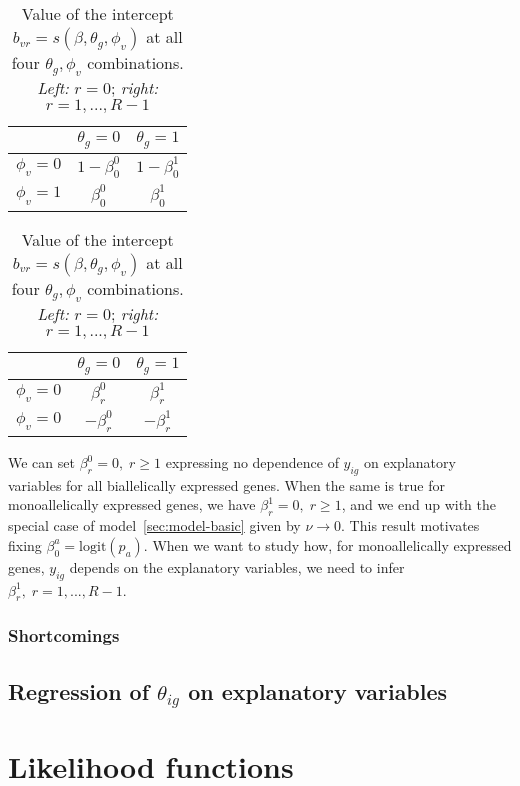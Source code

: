 \documentclass[letterpaper]{article}
\begin{document}
\begin{table}[h]
\begin{center}
\begin{tabular}{c|cc|}
& \(\theta_g=0\) & \(\theta_g=1\) \\
\hline
\(\phi_v=0\) & \(1-\beta_0^0\) & \(1-\beta_0^1\) \\
\(\phi_v=1\) & \(\beta_0^0\) & \(\beta_0^1\) \\
\hline
\end{tabular}
\hspace{\columnsep}
\begin{tabular}{c|cc|}
& \(\theta_g=0\) & \(\theta_g=1\) \\
\hline
\(\phi_v=0\) & \(\beta_{r}^0\) & \(\beta_{r}^1\) \\
\(\phi_v=0\) & \(-\beta_{r}^0\) & \(-\beta_{r}^1\) \\
\hline
\end{tabular}
\caption{
Value of the intercept \(b_{vr} = s(\beta,\theta_g,\phi_v)\) at all four
\(\theta_g,\phi_v\) combinations. \emph{Left:} \(r=0\); \emph{right:}
\(r=1,...,R-1\)
}
\label{tab:model-Y-regr-br}
\end{center}
\end{table}

We can set \(\beta_r^0=0,\;r\ge1\) expressing no dependence of \(y_{ig}\) on
explanatory variables for all biallelically expressed genes.  When the same is
true for monoallelically expressed genes, we have \(\beta_r^1=0,\;r\ge1\), and
we end up with the special case of model~\ref{sec:model-basic} given by
\(\nu\rightarrow 0\).  This result motivates fixing
\(\beta_0^a=\mathrm{logit}(p_a)\).  When we want to study how, for
monoallelically expressed genes, \(y_{ig}\) depends on the explanatory
variables, we need to infer \(\beta_r^1,\;r=1,...,R-1\).

\subsubsection{Shortcomings}

\subsection{Regression of \(\theta_{ig}\) on explanatory variables }
\label{sec:model-theta-regr}

\renewcommand{\thesubsection}{\arabic{section}.\arabic{subsection}}
\section{Likelihood functions}
\label{sec:likelihood}
\end{document}
